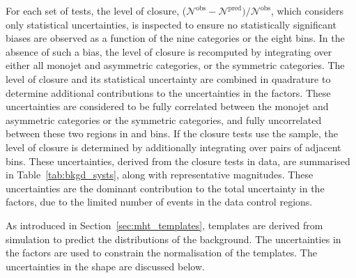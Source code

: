 For each set of tests, the level of closure, %
($\mathcal{N}^\text{obs} - \mathcal{N}^\text{pred}) /
\mathcal{N}^\text{obs}$, which considers only statistical
uncertainties, is inspected to ensure no statistically significant
biases are observed as a function of the nine \njet categories or the
eight \scalht bins. In the absence of such a bias, the level of
closure is recomputed by integrating over either all monojet and
asymmetric \njet categories, or the symmetric \njet categories. The
level of closure and its statistical uncertainty are combined in
quadrature to determine additional contributions to the uncertainties
in the \tf factors. These uncertainties are considered to be
fully correlated between the monojet and asymmetric \njet categories
or the symmetric \njet categories, and fully uncorrelated between
these two regions in \njet and \scalht bins. If the closure tests use
the \mmj sample, the level of closure is determined by additionally
integrating over pairs of adjacent \scalht bins. These uncertainties,
derived from the closure tests in data, are summarised in
Table~\ref{tab:bkgd_systs}, along with representative
magnitudes. These uncertainties are the dominant contribution to the
total uncertainty in the \tf factors, due to the limited number
of events in the data control regions.




As introduced in Section~\ref{sec:mht_templates}, templates are
derived from simulation to predict the \HTmiss distributions of the
background. The uncertainties in the \tf factors are used to constrain the
normalisation of the \HTmiss templates. The uncertainties in the
\HTmiss shape are discussed below.



